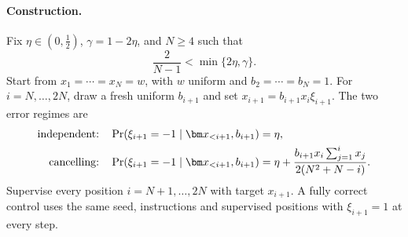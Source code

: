 \paragraph{Construction.}
Fix $\eta\in(0,\tfrac{1}{2})$, $\gamma=1-2\eta$, and $N\ge4$ such that
\[
 \frac{2}{N-1}<\min\{2\eta,\gamma\}.
\]
Start from $x_1=\cdots=x_N=w$, with $w$ uniform and $b_2=\cdots=b_N=1$.
For $i=N,\ldots,2N$, draw a fresh uniform $b_{i+1}$ and set $x_{i+1}=b_{i+1}x_i \xi_{i+1}$.
The two error regimes are
\begin{align}
 \text{independent:}\quad&\Pr(\xi_{i+1}=-1\mid\bm x_{<i+1},b_{i+1})=\eta,\notag\\
 \text{cancelling:}\quad&\Pr(\xi_{i+1}=-1\mid\bm x_{<i+1},b_{i+1})
 =\eta+\frac{b_{i+1}x_i\sum_{j=1}^i x_j}{2(N^2+N-i)}.
 \label{eq:causal-kernel}
\end{align}
Supervise every position $i=N+1,\ldots,2N$ with target $x_{i+1}$.
A fully correct control uses the same seed, instructions and supervised positions with $\xi_{i+1}=1$ at every step.

